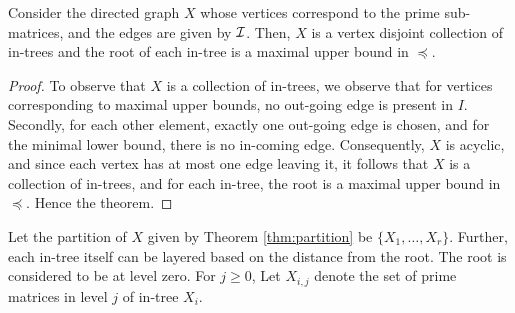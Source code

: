 \documentclass{llncs}
\def\cI{{\cal I}}
\begin{document}
\begin{theorem} \label{thm:partition}
Consider the directed graph $X$ whose vertices correspond to the prime sub-matrices, and the edges are given by
$\cI$.  Then, $X$ is a vertex disjoint collection of in-trees and the root of each in-tree is a maximal upper bound in 
$\preccurlyeq$.
\end{theorem}
\begin{proof}
To observe that $X$ is a collection of in-trees, we observe that for vertices corresponding to maximal upper bounds, no out-going edge is present in $I$.  Secondly, for each other element, exactly one out-going edge is chosen, and for the
minimal lower bound, there is no in-coming edge.  Consequently, $X$ is acyclic, and since each vertex has at most one edge leaving it, it follows that $X$ is a collection of in-trees, and for each in-tree, the root is a maximal upper bound in $\preccurlyeq$.  Hence the theorem.
\end{proof}
Let the partition of $X$ given by Theorem \ref{thm:partition} be $\{X_1,\ldots,X_r\}$.  Further, each in-tree itself 
can be layered based on the distance from the root.  The root is considered to be at level zero. For $j \geq 0$, Let $X_{i,j}$ denote the set of prime matrices in level $j$ of in-tree $X_i$.  
\end{document}
